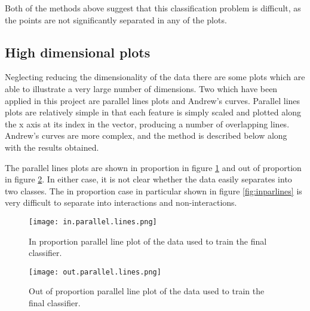 Both of the methods above suggest that this classification problem is difficult, as the points are not significantly separated in any of the plots.

\subsection{High dimensional plots}

Neglecting reducing the dimensionality of the data there are some plots which are able to illustrate a very large number of dimensions.
Two which have been applied in this project are parallel lines plots and Andrew's curves\autocite{andrews_plots_1972}.
Parallel lines plots are relatively simple in that each feature is simply scaled and plotted along the x axis at its index in the vector, producing a number of overlapping lines.
Andrew's curves are more complex, and the method is described below along with the results obtained.

The parallel lines plots are shown in proportion in figure \ref{fig:inparline} and out of proportion in figure \ref{fig:outparline}.
In either case, it is not clear whether the data easily separates into two classes.
The in proportion case in particular shown in figure \ref{fig:inparlines} is very difficult to separate into interactions and non-interactions.

\begin{figure}
    \texttt{[image: in.parallel.lines.png]}
    \centering
    \caption{In proportion parallel line plot of the data used to train the final classifier.}
    \label{fig:inparline}
\end{figure}

\begin{figure}
    \texttt{[image: out.parallel.lines.png]}   
    \centering
    \caption{Out of proportion parallel line plot of the data used to train the final classifier.}
    \label{fig:outparline}
\end{figure}

